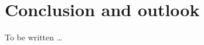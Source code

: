 \documentclass[amt, manuscript]{copernicus}
\begin{document}


\section{Conclusion and outlook}  %
%
To be written \dots















\appendix
\section{}    %

\subsection{}     %


\noappendix       %
\end{document}
